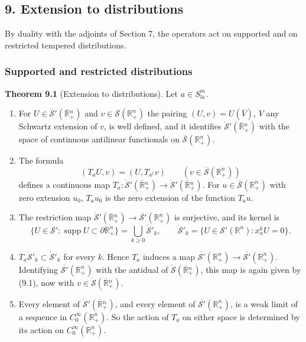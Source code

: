\documentclass[
  11pt,
]{article}
\begin{document}
\subsection{9. Extension to
distributions}\label{extension-to-distributions}

By duality with the adjoints of Section 7, the operators act on
supported and on restricted tempered distributions.

\subsubsection{Supported and restricted
distributions}\label{supported-and-restricted-distributions}

\textbf{Theorem 9.1} (Extension to distributions). Let
\(a\in S^m_{\mathrm{la}}\).

\begin{enumerate}
\def\labelenumi{(\alph{enumi})}
\item
  For \(U\in\dot{\mathcal S}'(\overline{\mathbb R}{}^n_+)\) and
  \(v\in\overline{\mathcal S}(\mathbb R^n_+)\) the pairing
  \((U,v)=U(\overline V)\), \(V\) any Schwartz extension of \(v\), is
  well defined, and it identifies
  \(\dot{\mathcal S}'(\overline{\mathbb R}{}^n_+)\) with the space of
  continuous antilinear functionals on
  \(\overline{\mathcal S}(\mathbb R^n_+)\).
\item
  The formula \[
(T_aU,v)=(U,T_{a^\dagger}v)\qquad(v\in\overline{\mathcal S}(\mathbb R^n_+))
\tag{9.1}
\] defines a continuous map
  \(T_a:\dot{\mathcal S}'(\overline{\mathbb R}{}^n_+)\to\dot{\mathcal S}'(\overline{\mathbb R}{}^n_+)\).
  For \(u\in\overline{\mathcal S}(\mathbb R^n_+)\) with zero extension
  \(u_0\), \(T_au_0\) is the zero extension of the function \(T_au\).
\item
  The restriction map
  \(\dot{\mathcal S}'(\overline{\mathbb R}{}^n_+)\to\overline{\mathcal S'}(\mathbb R^n_+)\)
  is surjective, and its kernel is \[
\{U\in\mathcal S':\operatorname{supp}U\subset\partial\mathbb R^n_+\}=\bigcup_{k\geq0}\dot{\mathcal S}'_k,\qquad \dot{\mathcal S}'_k=\{U\in\mathcal S'(\mathbb R^n):x_n^kU=0\}.
\tag{9.2}
\]
\item
  \(T_a\dot{\mathcal S}'_k\subset\dot{\mathcal S}'_k\) for every \(k\).
  Hence \(T_a\) induces a map
  \(\overline{\mathcal S'}(\mathbb R^n_+)\to\overline{\mathcal S'}(\mathbb R^n_+)\).
  Identifying \(\overline{\mathcal S'}(\mathbb R^n_+)\) with the
  antidual of \(\dot{\mathcal S}(\overline{\mathbb R}{}^n_+)\), this map
  is again given by (9.1), now with
  \(v\in\dot{\mathcal S}(\overline{\mathbb R}{}^n_+)\).
\item
  Every element of \(\dot{\mathcal S}'(\overline{\mathbb R}{}^n_+)\),
  and every element of \(\overline{\mathcal S'}(\mathbb R^n_+)\), is a
  weak limit of a sequence in \(C_0^\infty(\mathbb R^n_+)\). So the
  action of \(T_a\) on either space is determined by its action on
  \(C_0^\infty(\mathbb R^n_+)\).
\end{enumerate}
\end{document}
